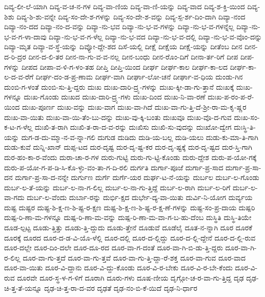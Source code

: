 {ದಿವ್ಯ-ಲೀ-ಲೆ-ಯಾಗಿ
ದಿವ್ಯ-ವ-ಚ-ನ-ಗಳ
ದಿವ್ಯ-ವಾ-ಣಿಯ
ದಿವ್ಯ-ವಾ-ಣಿ-ಯನ್ನು
ದಿವ್ಯ-ವಾದ
ದಿವ್ಯ-ಶ-ಕ್ತಿ-ಯಿಂದ
ದಿವ್ಯ-ಶಿಶು
ದಿವ್ಯ-ಶಿ-ಶು-ವನ್ನೇ
ದಿವ್ಯ-ಸಂ-ದೇ-ಶ-ಗಳನ್ನು
ದಿವ್ಯ-ಸಂ-ದೇ-ಶ-ವನ್ನು
ದಿವ್ಯ-ಸ್ಪ-ರ್ಶ-ದಿಂ-ದಾಗಿ
ದಿವ್ಯಾ-ನಂದ
ದಿವ್ಯಾ-ನಂ-ದದ
ದಿವ್ಯಾ-ನಂ-ದ-ವನ್ನು
ದಿವ್ಯಾ-ನು-ಭವ
ದಿವ್ಯಾ-ನು-ಭ-ವ-ಗಳನ್ನು
ದಿವ್ಯಾ-ನು-ಭ-ವ-ಗಳನ್ನೆಲ್ಲ
ದಿವ್ಯಾ-ನು-ಭ-ವ-ಗ-ಳಾ-ದಾವು
ದಿವ್ಯಾ-ನು-ಭ-ವ-ಗ-ಳೆಲ್ಲ
ದಿವ್ಯಾ-ನು-ಭ-ವದ
ದಿವ್ಯಾ-ನು-ಭ-ವ-ದಲ್ಲಿ
ದಿವ್ಯಾ-ನು-ಭ-ವ-ವೊಂ-ದನ್ನು
ದಿವ್ಯಾ-ಮೃತ
ದಿವ್ಯಾ-ವ-ಸ್ಥೆ-ಯನ್ನು
ದಿವ್ಯೋ-ದ್ದೇ-ಶದ
ದಿಸೆ-ಯಲ್ಲಿ
ದೀಕ್ಷೆ
ದೀಕ್ಷೆಯ
ದೀಕ್ಷೆ-ಯನ್ನು
ದೀತೆಂಬ
ದೀನ
ದೀನ-ದ-ರಿ-ದ್ರರ
ದೀನ-ದ-ಲಿ-ತರ
ದೀನ-ನಾ-ಗು-ವ-ವ-ನಲ್ಲ
ದೀನ-ಬಂಧು
ದೀನ-ರೊಂ-ದಿಗೆ
ದೀನಾ-ರ್ತ-ರಿಗೆ
ದೀಪ
ದೀಪ-ಗಳನ್ನು
ದೀಪದ
ದೀಪಾ-ವ-ಳಿ-ಗ-ಳಂ-ತಹ
ದೀಪ್ತಿ
ದೀಪ್ತಿ-ಯಿಂದ
ದೀರ್ಘ
ದೀರ್ಘ-ಕಾಲ
ದೀರ್ಘ-ಕಾ-ಲದ
ದೀರ್ಘ-ಕಾ-ಲ-ದ-ವ-ರೆಗೆ
ದೀರ್ಘ-ದಂ-ಡ-ಪ್ರ-ಣಾಮ
ದೀರ್ಘ-ವಾಗಿ
ದೀರ್ಘಾ-ಲೋ-ಚನೆ
ದೀರ್ಘಾ-ವ-ಧಿಯ
ದುಂಡು-ಗಿನ
ದುಂಬಿ-ಗ-ಳಂತೆ
ದುಂಬಿ-ಸು-ತ್ತಿ-ದ್ದರು
ದುಃಖ
ದುಃಖ-ದಾರಿ-ದ್ರ್ಯ-ಗಳನ್ನು
ದುಃಖ-ಕ್ಕೀ-ಡಾ-ಗು-ತ್ತಾನೆ
ದುಃಖಕ್ಕೆ
ದುಃಖ-ಗಳನ್ನೂ
ದುಃಖ-ಗೊಂಡು
ದುಃಖದ
ದುಃಖ-ದಾರಿ-ದ್ರ್ಯ-ಗಳು
ದುಃಖ-ದಿಂದ
ದುಃಖ-ನಿ-ವಾ-ರಣೆ
ದುಃಖ-ಪ-ರಂ-ಪ-ರೆ-ಯಿಂದ
ದುಃಖ-ಪೂರ್ಣ
ದುಃಖ-ವನ್ನು
ದುಃಖ-ವಾಗ
ದುಃಖ-ವಾ-ಗಿದೆ
ದುಃಖ-ವಾ-ಗು-ತ್ತಿ-ದೆ-ಶ್ರೀ-ರಾ-ಮ-ಕೃ-ಷ್ಣರ
ದುಃಖ-ವಾ-ಯಿತು
ದುಃಖ-ವಾ-ಯಿ-ತೆಂ-ಬು-ದನ್ನು
ದುಃಖ-ವು-ಕ್ಕಿ-ಬಂತು
ದುಃಖವೂ
ದುಃಖ-ವೊ-ದ-ಗುವ
ದುಃಖ-ಸಂ-ಕ-ಟ-ಗ-ಳೆಲ್ಲ
ದುಃಖಿ-ತ-ರಾಗಿ
ದುಃಖಿ-ತ-ರಾ-ದ-ವ-ರನ್ನು
ದುಃಖಿಸು
ದುಃಖಿ-ಸು-ವುದನ್ನು
ದುಃಖೋ-ದ್ವೇಗ
ದುಃಸ್ಥಿ-ತಿ-ಯನ್ನು
ದುಗ-ಡ-ದು-ಮ್ಮಾ-ನ-ವ-ನ್ನಾ-ಗಲಿ
ದುಗುಡ
ದುಡಿದು
ದುಡಿ-ಯ-ಬಲ್ಲ
ದುಡಿ-ಯಲು
ದುಡು-ಕು-ಮಾ-ತಿ-ಗಾಗಿ
ದುಡು-ಕುವೆ
ದುನ್ನಿ-ಖಾನ್
ದುಪ್ಪ-ಟದ
ದುರ-ದೃಷ್ಟ
ದುರ-ದೃ-ಷ್ಟ-ಕರ
ದುರ-ದೃ-ಷ್ಟಕ್ಕೆ
ದುರ-ದೃ-ಷ್ಟದ
ದುರ-ಸ್ತಿ-ಗಾಗಿ
ದುರ-ಹಂ-ಕಾ-ರ-ವೆಂದು
ದುರಾ-ಚಾ-ರ-ಗಳ
ದುರು-ಗುಟ್ಟಿ
ದುರು-ಗು-ಟ್ಟಿ-ಕೊಂಡು
ದುರು-ದ್ದೇಶ
ದುರು-ಪ-ಯೋ-ಗಕ್ಕೆ
ದುರು-ಪ-ಯೋ-ಗ-ಪ-ಡಿ-ಸಿ-ಕೊ-ಳ್ಳು-ವಂ-ತಾ-ಗ-ದಿ-ರಲಿ
ದುರ್ಗತಿ
ದುರ್ಗಾ-ಪೂಜೆ
ದುರ್ಗಾ-ಪ್ರ-ಸಾದ
ದುರ್ಗಾ-ಪ್ರ-ಸಾ-ದನ
ದುರ್ಗಾ-ಪ್ರ-ಸಾ-ದ-ನನ್ನೇ
ದುರ್ಗುಣ
ದುರ್ಗೆ
ದುರ್ಗೆ-ಯರ
ದುರ್ಘ-ಟ-ನೆ-ಯನ್ನು
ದುರ್ಬಲ
ದುರ್ಬ-ಲ-ಗೊಂಡು
ದುರ್ಬ-ಲ-ತೆ-ಯನ್ನು
ದುರ್ಬ-ಲ-ನಾ-ಗ-ಲಿಲ್ಲ
ದುರ್ಬ-ಲ-ನಾ-ಗು-ತ್ತಿದ್ದೆ
ದುರ್ಬ-ಲ-ರಾಗಿ
ದುರ್ಬ-ಲ-ರಿಗೆ
ದುರ್ಬ-ಲ-ವಾ-ಗದು
ದುರ್ಬ-ಲ-ವೆಂದು
ದುರ್ಬಾ-ರನ್ನು
ದುರ್ಭಿ-ಕ್ಷದ
ದುರ್ಭೇ-ದ್ಯ-ವಾ-ಯಿತು
ದುರ್ವಿ-ನಿ-ಯೋಗ
ದುರ್ವ್ಯಯ
ದುಷ್ಟ
ದುಷ್ಟರ
ದುಷ್ಟ-ಶಿ-ಕ್ಷ-ಣ-ಶಿ-ಷ್ಟ-ರ-ಕ್ಷಣ
ದುಷ್ಟ-ಶಿ-ಕ್ಷ-ಣ-ಶಿ-ಷ್ಟ-ರ-ಕ್ಷ-ಣೆ-ಗಳನ್ನು
ದುಷ್ಟ-ಸಂ-ಪ್ರ-ದಾಯ
ದುಷ್ಪರಿ
ದುಷ್ಪ-ರಿ-ಣಾ-ಮ-ಗಳನ್ನೂ
ದುಷ್ಪ-ರಿ-ಣಾ-ಮ-ವನ್ನು
ದುಷ್ಪ-ರಿ-ಣಾ-ಮ-ವಾ-ಗ-ಬ-ಹು-ದೆಂಬ
ದುಸ್ಥಿತಿ
ದುಸ್ಥಿ-ತಿಯೇ
ದೂಡ-ಲ್ಪಟ್ಟ
ದೂಡು-ತ್ತಿತ್ತು
ದೂಡು-ತ್ತಿ-ದ್ದುದು
ದೂಡು-ತ್ತೇನೆ
ದೂಡುವೆ
ದೂಡೆಲೈ
ದೂತ-ನ-ನ್ನಾಗಿ
ದೂರ
ದೂರಕೆ
ದೂರಕ್ಕೆ
ದೂರದ
ದೂರ-ದ-ಡ-ವಿ-ಯೊ-ಳೆಲ್ಲಿ
ದೂರ-ದಲ್ಲಿ
ದೂರ-ದ-ಲ್ಲಿದ್ದು
ದೂರ-ದ-ಲ್ಲಿ-ದ್ದೇನೆ
ದೂರ-ದ-ಲ್ಲಿ-ರುವ
ದೂರ-ದಲ್ಲೇ
ದೂರ-ದಿಂ-ದಲೇ
ದೂರ-ದೂ-ರದ
ದೂರ-ವಾ-ಗ-ದಂತೆ
ದೂರ-ವಾ-ಗಿ-ಬಿ-ಡು-ತ್ತಿ-ದ್ದರು
ದೂರ-ವಾ-ಗಿ-ರ-ಲಿಲ್ಲ
ದೂರ-ವಾ-ಗು-ತ್ತದೆ
ದೂರ-ವಾ-ಗು-ತ್ತವೆ
ದೂರ-ವಾ-ಗು-ತ್ತಿ-ದ್ದಾ-ರೆ-ಶಕ್ತ
ದೂರ-ವಾ-ಗುವ
ದೂರ-ವಾದ
ದೂರ-ವಾ-ಯಿತು
ದೂರ-ವಿ-ದ್ದಾನು
ದೂರ-ವಿ-ದ್ದು-ಕೊಂಡು
ದೂರ-ವಿ-ರ-ಬೇಕು
ದೂರ-ವಿ-ರ-ಬೇ-ಕೆಂದು
ದೂರ-ವಿ-ರುವ
ದೂರವೇ
ದೂರ-ಸ್ಥ-ಳ-ಗ-ಳಿಗೆ
ದೂರಾಗಿ
ದೂರು-ಗಳು
ದೂಷ-ಣೀಯ
ದೃಗ್ಗೋ-ಚ-ರ-ವಾ-ಗು-ತ್ತಿದ್ದ
ದೃಢ
ದೃಢ-ಚಿ-ತ್ತ-ತೆ-ಯನ್ನೂ
ದೃಢ-ಚಿ-ತ್ತ-ರಾ-ದ-ವರ
ದೃಢತೆ
ದೃಢ-ನಂ-ಬಿ-ಕೆ-ಯಿದೆ
ದೃಢ-ನಿ-ರ್ಧಾರ
}
